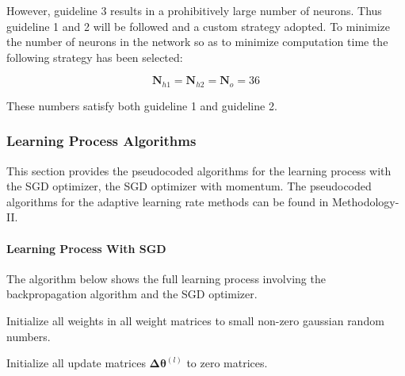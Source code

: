 \documentclass{article}
\begin{document}
 However, guideline 3 results in a prohibitively large number of neurons. Thus guideline 1 and 2 will be followed and a custom strategy adopted.
 To minimize the number of neurons in the network so as to minimize computation time the following strategy has been selected:
 
 \begin{equation}
 	\boldsymbol{N}_{h1} = \boldsymbol{N}_{h2} = \boldsymbol{N}_o = 36
 \end{equation}

These numbers satisfy both guideline 1 and guideline 2.


\subsubsection{Learning Process Algorithms}
This section provides the pseudocoded algorithms for the learning process with the SGD optimizer, the SGD optimizer with momentum. The pseudocoded algorithms for the adaptive learning rate methods can be found in Methodology-II.

\paragraph{Learning Process With SGD}
The algorithm below shows the full learning process involving the backpropagation algorithm and the SGD optimizer.
\begin{algorithm}
	\SetAlgoLined
	
	Initialize all weights in all weight matrices to small non-zero gaussian random numbers.
	
	Initialize all update matrices $\boldsymbol{\Delta\theta}^{(l)}$ to zero matrices.
	
\end{algorithm}
\end{document}
